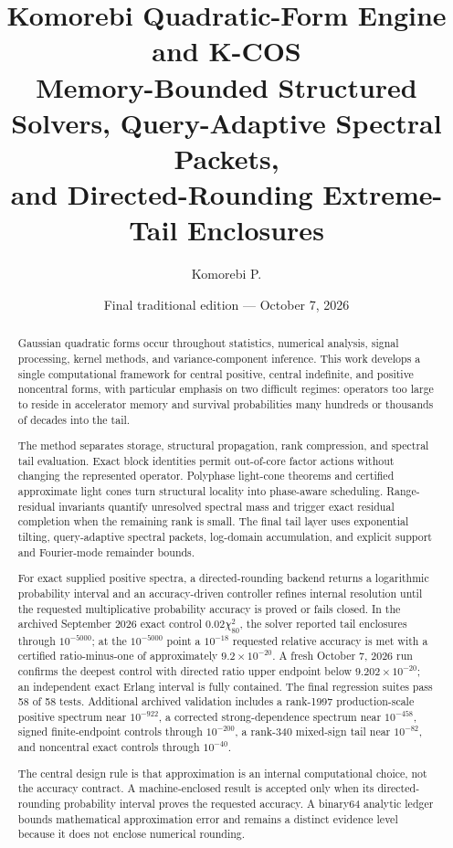 \documentclass[11pt]{article}
\title{\textbf{Komorebi Quadratic-Form Engine and K-COS}\\
\large Memory-Bounded Structured Solvers, Query-Adaptive Spectral Packets,\\
and Directed-Rounding Extreme-Tail Enclosures}
\author{Komorebi P.}
\date{Final traditional edition --- October 7, 2026}
\theoremstyle{definition}
\theoremstyle{remark}
\begin{document}
\maketitle

\begin{abstract}
Gaussian quadratic forms occur throughout statistics, numerical analysis,
signal processing, kernel methods, and variance-component inference.  This
work develops a single computational framework for central positive,
central indefinite, and positive noncentral forms, with particular emphasis
on two difficult regimes: operators too large to reside in accelerator memory
and survival probabilities many hundreds or thousands of decades into the
tail.

The method separates storage, structural propagation, rank compression, and
spectral tail evaluation.  Exact block identities permit out-of-core factor
actions without changing the represented operator.  Polyphase light-cone
theorems and certified approximate light cones turn structural locality into
phase-aware scheduling.  Range-residual invariants quantify unresolved
spectral mass and trigger exact residual completion when the remaining rank is
small.  The final tail layer uses exponential tilting, query-adaptive spectral
packets, log-domain accumulation, and explicit support and Fourier-mode
remainder bounds.

For exact supplied positive spectra, a directed-rounding backend returns a
logarithmic probability interval and an accuracy-driven controller refines
internal resolution until the requested multiplicative probability accuracy is
proved or fails closed.  In the archived September 2026 exact control
\(0.02\chi^2_{80}\), the solver reported tail enclosures through \(10^{-5000}\);
at the \(10^{-5000}\) point a \(10^{-18}\) requested relative accuracy is
met with a certified ratio-minus-one of approximately
\(9.2\times10^{-20}\).  A fresh October 7, 2026 run confirms the deepest control with directed
ratio upper endpoint below \(9.202\times10^{-20}\); an independent exact
Erlang interval is fully contained.  The final regression suites pass 58 of
58 tests.  Additional archived validation includes a rank-1997
production-scale positive spectrum near \(10^{-922}\), a corrected
strong-dependence spectrum near \(10^{-458}\), signed finite-endpoint controls
through \(10^{-200}\), a rank-340 mixed-sign tail near \(10^{-82}\), and
noncentral exact controls through \(10^{-40}\).

The central design rule is that approximation is an internal computational
choice, not the accuracy contract.  A machine-enclosed result is accepted only when its directed-rounding
probability interval proves the requested accuracy.  A binary64 analytic
ledger bounds mathematical approximation error and remains a distinct
evidence level because it does not enclose numerical rounding.
\end{abstract}
\end{document}
